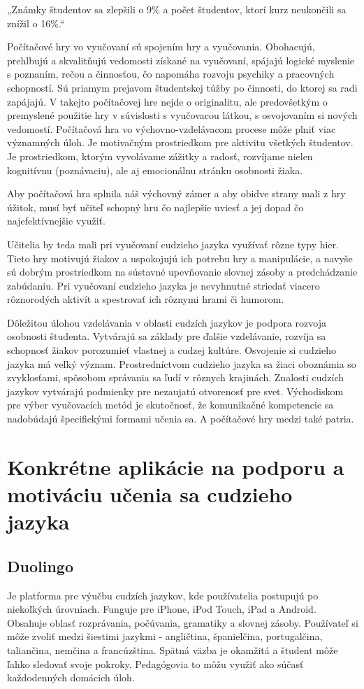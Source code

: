\documentclass{article}
\begin{document}
„Známky študentov sa zlepšili o 9\% a počet študentov, ktorí kurz neukončili sa
znížil o 16\%\cite{horizon}.“

Počítačové hry vo vyučovaní sú spojením hry a vyučovania. Obohacujú, prehlbujú a skvalitňujú vedomosti získané na vyučovaní, spájajú logické myslenie s poznaním, rečou a činnosťou, čo napomáha rozvoju psychiky a pracovných schopností. Sú priamym prejavom študentskej túžby po činnosti, do ktorej sa radi zapájajú. V takejto počítačovej hre nejde o originalitu, ale predovšetkým o premyslené použitie hry v súvislosti s vyučovacou látkou, s osvojovaním si nových vedomostí. Počítačová hra vo výchovno-vzdelávacom procese môže plniť viac významných úloh. Je motivačným prostriedkom pre aktivitu všetkých študentov. Je prostriedkom, ktorým vyvolávame zážitky a radosť, rozvíjame nielen kognitívnu (poznávaciu), ale aj emocionálnu stránku osobnosti žiaka. 

Aby počítačová hra splnila náš výchovný zámer a aby obidve strany mali z hry úžitok, musí byť učiteľ
schopný hru čo najlepšie uviesť a jej dopad čo najefektívnejšie využiť\cite{hricova}. 

Učitelia by teda mali pri vyučovaní cudzieho jazyka využívať rôzne typy hier. Tieto hry motivujú
žiakov a uspokojujú ich potrebu hry a manipulácie, a navyše sú dobrým prostriedkom na sústavné
upevňovanie slovnej zásoby a predchádzanie zabúdaniu. Pri vyučovaní cudzieho jazyka je nevyhnutné striedať viacero rôznorodých aktivít a spestrovať ich rôznymi hrami či humorom.

Dôležitou úlohou vzdelávania v oblasti cudzích jazykov je podpora rozvoja osobnosti študenta. Vytvárajú sa základy pre ďalšie vzdelávanie, rozvíja sa schopnosť žiakov porozumieť vlastnej a cudzej kultúre. Osvojenie si cudzieho jazyka má veľký význam. Prostredníctvom cudzieho jazyka sa žiaci oboznámia so zvyklosťami, spôsobom správania sa ľudí v rôznych krajinách. Znalosti cudzích jazykov vytvárajú podmienky pre nezaujatú otvorenosť pre svet. Východiskom pre výber vyučovacích metód je
skutočnosť, že komunikačné kompetencie sa nadobúdajú špecifickými formami
učenia sa\cite{hrehova}. A počítačové hry medzi také patria.

\section {Konkrétne aplikácie na podporu a motiváciu učenia sa cudzieho jazyka}\label{aplikacie}

\subsection {Duolingo}
Je platforma pre výučbu cudzích jazykov, kde používatelia postupujú po niekoľkých úrovniach. Funguje pre iPhone, iPod Touch, iPad a Android. Obsahuje oblasť rozprávania, počúvania, gramatiky a slovnej zásoby. Používateľ si môže zvoliť medzi šiestimi jazykmi - angličtina, španielčina, portugalčina, taliančina, nemčina a francúzština. Spätná väzba je okamžitá a študent môže ľahko sledovať svoje pokroky. Pedagógovia to môžu využiť ako súčasť každodenných domácich úloh\cite{hlavnyclanok}. 
\end{document}
